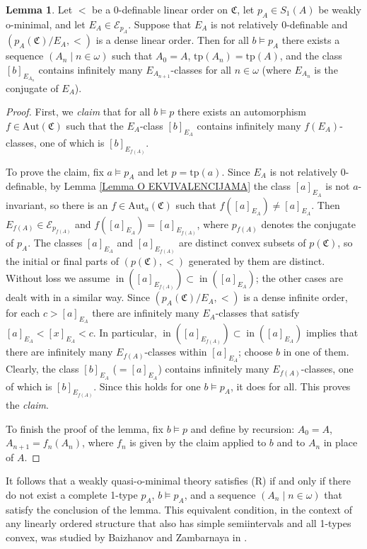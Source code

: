 \documentclass{amsart}
\theoremstyle{definition}
\newtheorem{Lemma}[Theorem]{Lemma}
\theoremstyle{definition}
\newcommand{\Mon}{\mathfrak C}
\newcommand{\tp}{\mathrm{tp}}
\newcommand{\Aut}{\mathrm{Aut}}
\DeclareMathOperator{\supin}{in}
\begin{document}
\begin{Lemma}\label{Lemma_non_R} Let $<$ be a 0-definable linear order on $\Mon$, let $p_A\in S_1(A)$ be weakly o-minimal, and let $E_A\in\mathcal E_{p_A}$. Suppose that $E_A$ is not relatively $0$-definable and $(p_A(\Mon)/E_A,<)$ is a dense linear order. 
Then for all $b\models p_A$ there exists a sequence $(A_n\mid n\in\omega)$ such that $A_0=A$, $\tp(A_{n})=\tp(A)$, and the class $[b]_{E_{A_n}}$ contains infinitely many $E_{A_{n+1}}$-classes for all $n\in \omega$ (where $E_{A_n}$ is the conjugate of $E_A$).
\end{Lemma}
\begin{proof} First, we {\it claim} that for all $b\models p$ there exists an automorphism $f\in \Aut(\Mon)$ such that the $E_A$-class $[b]_{E_A}$ contains infinitely many $f(E_A)$-classes, one of which is $[b]_{E_{f(A)}}$. 

To prove the claim, fix $a\models p_A$ and let $p=\tp(a)$. Since $E_A$ is not relatively 0-definable, by Lemma \ref{Lemma O EKVIVALENCIJAMA} the class $[a]_{E_A}$ is not $a$-invariant, so there is an $f\in \Aut_a(\Mon)$ such that $f([a]_{E_A})\neq [a]_{E_A}$. Then $E_{f(A)} \in \mathcal E_{p_{f(A)}}$ and $f([a]_{E_A})=[a]_{E_{f(A)}}$, where $p_{f(A)}$ denotes the conjugate of $p_A$. The classes $[a]_{E_A}$ and $[a]_{E_{f(A)}}$ are distinct convex subsets of $p(\Mon)$, so the initial or final parts of $(p(\Mon),<)$ generated by them are distinct. Without loss we assume $\supin ([a]_{E_{f(A)}})\subset \supin ([a]_{E_A})$; the other cases are dealt with in a similar way. 
Since $(p_A(\Mon)/E_A,<)$ is a dense infinite order, for each $c>[a]_{E_A}$ there are infinitely many $E_A$-classes that satisfy $[a]_{E_A}<[x]_{E_A}<c$. In particular, $\supin ([a]_{E_{f(A)}})\subset \supin ([a]_{E_A})$ implies that there are infinitely many $E_{f(A)}$-classes within $[a]_{E_{A}}$; choose $b$ in one of them. Clearly, the class $[b]_{E_A}$ ($=[a]_{E_A}$) contains infinitely many $E_{f(A)}$-classes, one of which is $[b]_{E_{f(A)}}$. Since this holds for one $b\models p_A$, it does for all. This proves the {\it claim}. 

To finish the proof of the lemma, fix $b\models p$ and define by recursion: $A_0=A$, $A_{n+1}=f_n(A_n)$, where $f_n$ is given by the claim applied to $b$ and to $A_n$ in place of $A$.  
\end{proof} 

It follows that a weakly quasi-o-minimal theory satisfies (R) if and only if there do not exist a complete 1-type $p_A$, $b\models p_A$, and a sequence $(A_n\mid n\in\omega)$ that satisfy the conclusion of the lemma. This equivalent condition, in the context of any linearly ordered structure that also has simple semiintervals and all 1-types convex, was studied by Baizhanov and Zambarnaya in \cite{Baizhanov2025}.   
\end{document}
